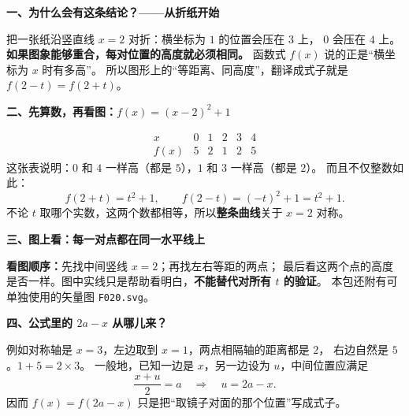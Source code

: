 \clearpage
\begin{explanationbox}
  \textbf{\textcolor{CExplanation}{一、为什么会有这条结论？——从折纸开始}}


  把一张纸沿竖直线 $x=2$ 对折：横坐标为 $1$ 的位置会压在 $3$ 上，
  $0$ 会压在 $4$ 上。\textbf{如果图象能够重合，每对位置的高度就必须相同。}
  函数式 $f(x)$ 说的正是“横坐标为 $x$ 时有多高”。
  所以图形上的“等距离、同高度”，翻译成式子就是 $f(2-t)=f(2+t)$。

  \medskip
  
\end{explanationbox}
\clearpage
\begin{explanationbox}
\textbf{\textcolor{CExplanation}{二、先算数，再看图：$f(x)=(x-2)^2+1$}}


  \[
    \begin{array}{c|ccccc}
      x &0&1&2&3&4\\ \hline
      f(x)&5&2&1&2&5
    \end{array}
  \]
  这张表说明：$0$ 和 $4$ 一样高（都是 $5$），$1$ 和 $3$ 一样高（都是 $2$）。
  而且不仅整数如此：
  \[
    f(2+t)=t^2+1,\qquad f(2-t)=(-t)^2+1=t^2+1.
  \]
  不论 $t$ 取哪个实数，这两个数都相等，所以\textbf{整条曲线}关于 $x=2$ 对称。

  \medskip
  
\end{explanationbox}
\clearpage
\begin{explanationbox}
\textbf{\textcolor{CExplanation}{三、图上看：每一对点都在同一水平线上}}


  
  \textbf{看图顺序：}先找中间竖线 $x=2$；再找左右等距的两点；
  最后看这两个点的高度是否一样。图中实线只是帮助看明白，\textbf{不能替代对所有 $t$ 的验证}。
  本包还附有可单独使用的矢量图 \texttt{F020.svg}。

  \medskip
  
\end{explanationbox}
\clearpage
\begin{explanationbox}
\textbf{\textcolor{CExplanation}{四、公式里的 $2a-x$ 从哪儿来？}}


  例如对称轴是 $x=3$，左边取到 $x=1$，两点相隔轴的距离都是 $2$，
  右边自然是 $5$。$1+5=2\times3$。
  一般地，已知一边是 $x$，另一边设为 $u$，中间位置应满足
  \[
     \frac{x+u}{2}=a\quad\Longrightarrow\quad u=2a-x.
  \]
  因而 $f(x)=f(2a-x)$ 只是把“取镜子对面的那个位置”写成式子。

  \medskip
  
\end{explanationbox}
